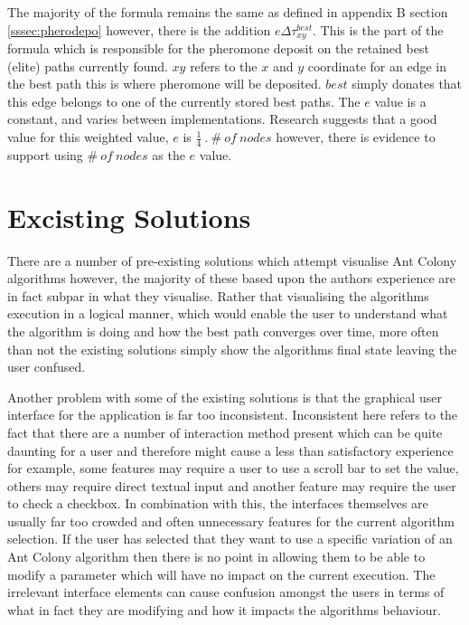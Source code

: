 The majority of the formula remains the same as defined in appendix B section \ref{sssec:pherodepo} however, there is the addition $e\Delta\tau_{xy}^{best}$. This is the part of the formula which is responsible for the pheromone deposit on the retained best (elite) paths currently found. $xy$ refers to the $x$ and $y$ coordinate for an edge in the best path this is where pheromone will be deposited. $best$ simply donates that this edge belongs to one of the currently stored best paths. The $e$ value is a constant, and varies between implementations. Research suggests that a good value for this weighted value, $e$ is $\frac{1}{4}\ .\ \#\ of \ nodes$ \cite{sjored:Thesus2012:evalue} however, there is evidence to support using $\#\ of \ nodes$ as the $e$ value\cite{marcdorgio:book:nopage}.

\section{Excisting Solutions}
\label{existingsolutions}
There are a number of pre-existing solutions which attempt visualise Ant Colony algorithms however, the majority of these based upon the authors experience are in fact subpar in what they visualise. Rather that visualising the algorithms execution in a logical manner, which would enable the user to understand what the algorithm is doing and how the best path converges over time, more often than not the existing solutions simply show the algorithms final state leaving the user confused.

Another problem with some of the existing solutions is that the graphical user interface for the application is far too inconsistent. Inconsistent here refers to the fact that there are a number of interaction method present which can be quite daunting for a user and therefore might cause a less than satisfactory experience for example, some features may require a user to use a scroll bar to set the value, others may require direct textual input and another feature may require the user to check a checkbox. In combination with this, the interfaces themselves are usually far too crowded and often unnecessary features for the current algorithm selection. If the user has selected that they want to use a specific variation of an Ant Colony algorithm then there is no point in allowing them to be able to modify a parameter which will have no impact on the current execution. The irrelevant interface elements can cause confusion amongst the users in terms of what in fact they are modifying and how it impacts the algorithms behaviour. 

